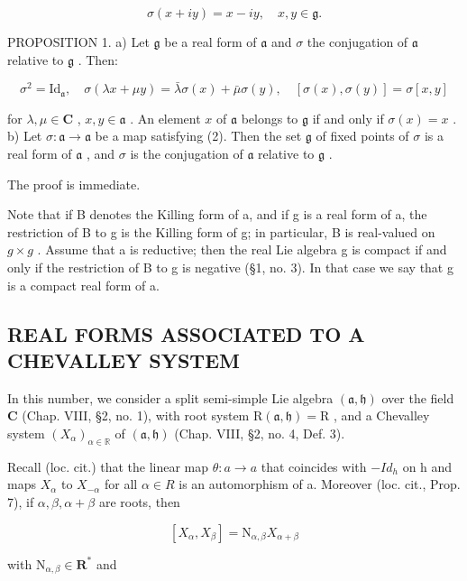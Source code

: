 \[
\sigma (x + i y) = x - i y, \quad x, y \in \mathfrak {g}.\tag{1}
\]

PROPOSITION 1. a) Let \(\mathfrak{g}\) be a real form of \(\mathfrak{a}\) and \(\sigma\) the conjugation of \(\mathfrak{a}\) relative to \(\mathfrak{g}\) . Then:

\[
\sigma^ {2} = \mathrm{Id} _ {\mathfrak {a}}, \quad \sigma (\lambda x + \mu y) = \bar {\lambda} \sigma (x) + \bar {\mu} \sigma (y), \quad [ \sigma (x), \sigma (y) ] = \sigma [ x, y ]\tag{2}
\]

for \(\lambda, \mu \in \mathbf{C}\) , \(x, y \in \mathfrak{a}\) . An element \(x\) of \(\mathfrak{a}\) belongs to \(\mathfrak{g}\) if and only if \(\sigma(x) = x\) . b) Let \(\sigma: \mathfrak{a} \to \mathfrak{a}\) be a map satisfying (2). Then the set \(\mathfrak{g}\) of fixed points of \(\sigma\) is a real form of \(\mathfrak{a}\) , and \(\sigma\) is the conjugation of \(\mathfrak{a}\) relative to \(\mathfrak{g}\) .

The proof is immediate.

Note that if B denotes the Killing form of a, and if g is a real form of a, the restriction of B to g is the Killing form of g; in particular, B is real-valued on \(g \times g\) . Assume that a is reductive; then the real Lie algebra g is compact if and only if the restriction of B to g is negative (§1, no. 3). In that case we say that g is a compact real form of a.

\subsection{REAL FORMS ASSOCIATED TO A CHEVALLEY SYSTEM}

In this number, we consider a split semi-simple Lie algebra \((\mathfrak{a},\mathfrak{h})\) over the field \(\mathbf{C}\) (Chap. VIII, §2, no. 1), with root system \(\mathrm{R}(\mathfrak{a},\mathfrak{h}) = \mathrm{R}\) , and a Chevalley system \((X_{\alpha})_{\alpha \in \mathbb{R}}\) of \((\mathfrak{a},\mathfrak{h})\) (Chap. VIII, §2, no. 4, Def. 3).

Recall (loc. cit.) that the linear map \(\theta: a \to a\) that coincides with \(-Id_{h}\) on h and maps \(X_{\alpha}\) to \(X_{-\alpha}\) for all \(\alpha \in R\) is an automorphism of a. Moreover (loc. cit., Prop. 7), if \(\alpha, \beta, \alpha + \beta\) are roots, then

\[
[ X _ {\alpha}, X _ {\beta} ] = \mathrm{N} _ {\alpha , \beta} X _ {\alpha + \beta}\tag{3}
\]

with \(\mathrm{N}_{\alpha ,\beta}\in \mathbf{R}^*\) and

